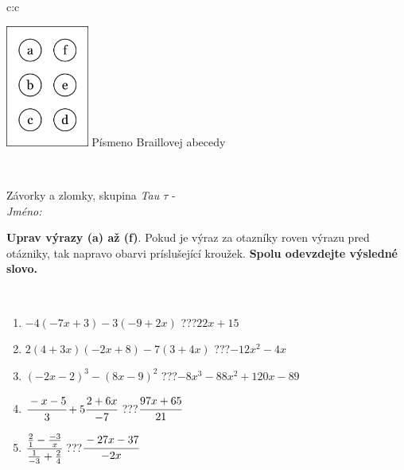 \documentclass[10pt]{report}
\begin{document}
\begin{tabular}{c:c}
\begin{minipage}[c][104.5mm][t]{0.5\linewidth}
\begin{center}
\begin{minipage}{0.20\linewidth}
\begin{center}
\includegraphics[height=40mm]{../images/braille.png}
{\small Písmeno Braillovej abecedy}
\end{center}
\end{minipage}
\end{center}
\end{minipage}
\\ \hdashline
\begin{minipage}[c][104.5mm][t]{0.5\linewidth}
\begin{center}
\vspace{7mm}
{\huge Závorky a zlomky, skupina \textit{Tau $\tau$} -}\\[5mm]
\textit{Jméno:}\phantom{xxxxxxxxxxxxxxxxxxxxxxxxxxxxxxxxxxxxxxxxxxxxxxxxxxxxxxxxxxxxxxxxx}\\[5mm]
\begin{minipage}{0.95\linewidth}
\begin{center}
\textbf{Uprav výrazy (a) až (f)}. Pokud je výraz za otazníky roven výrazu pred otázniky, tak napravo obarvi príslušející kroužek. \textbf{Spolu odevzdejte výsledné slovo.}
\end{center}
\end{minipage}
\\[1mm]
\begin{minipage}{0.79\linewidth}
\begin{center}
\begin{varwidth}{\linewidth}
\begin{enumerate}
\normalsize
\item $-4(-7x+3)-3(-9+2x)$\quad \dotfill\; ???\;\dotfill \quad $22x+15$
\item $2(4+3x)(-2x+8)-7(3+4x)$\quad \dotfill\; ???\;\dotfill \quad $-12x^2-4x$
\item $(-2x-2)^3-(8x-9)^2$\quad \dotfill\; ???\;\dotfill \quad $-8x^3-88x^2+120x-89$
\item $\cfrac{-x-5}{3}+5\cfrac{2+6x}{-7}$\quad \dotfill\; ???\;\dotfill \quad $\cfrac{97x+65}{21}$
\item $\cfrac{\frac{2}{1}-\frac{-3}{x}}{\frac{1}{-3}+\frac{2}{4}}$\quad \dotfill\; ???\;\dotfill \quad $\cfrac{-27x-37}{-2x}$

\end{enumerate}
\end{varwidth}
\end{center}
\end{minipage}
\end{center}
\end{minipage}
\end{tabular}
\end{document}
